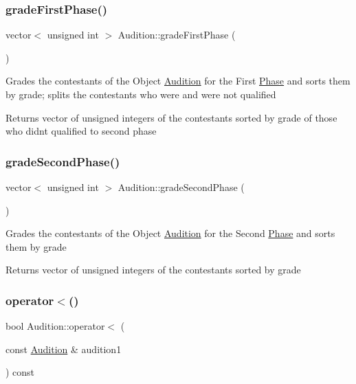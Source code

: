 \subsubsection{\texorpdfstring{grade\+First\+Phase()}{gradeFirstPhase()}}
{\footnotesize\ttfamily vector$<$ unsigned int $>$ Audition\+::grade\+First\+Phase (\begin{DoxyParamCaption}{ }\end{DoxyParamCaption})}

Grades the contestants of the Object \hyperlink{class_audition}{Audition} for the First \hyperlink{class_phase}{Phase} and sorts them by grade; splits the contestants who were and were not qualified \begin{DoxyReturn}{Returns}
vector of unsigned integers of the contestants sorted by grade of those who didn\textquotesingle{}t qualified to second phase 
\end{DoxyReturn}
\mbox{\label{class_audition_a78dc27847791ceac4524268ce059b832}} 
\subsubsection{\texorpdfstring{grade\+Second\+Phase()}{gradeSecondPhase()}}
{\footnotesize\ttfamily vector$<$ unsigned int $>$ Audition\+::grade\+Second\+Phase (\begin{DoxyParamCaption}{ }\end{DoxyParamCaption})}

Grades the contestants of the Object \hyperlink{class_audition}{Audition} for the Second \hyperlink{class_phase}{Phase} and sorts them by grade \begin{DoxyReturn}{Returns}
vector of unsigned integers of the contestants sorted by grade 
\end{DoxyReturn}
\mbox{\label{class_audition_ab9ceb3af47f97b5ca6e941712edf2db0}} 
\subsubsection{\texorpdfstring{operator$<$()}{operator<()}}
{\footnotesize\ttfamily bool Audition\+::operator$<$ (\begin{DoxyParamCaption}\item[{const \hyperlink{class_audition}{Audition} \&}]{audition1 }\end{DoxyParamCaption}) const}

